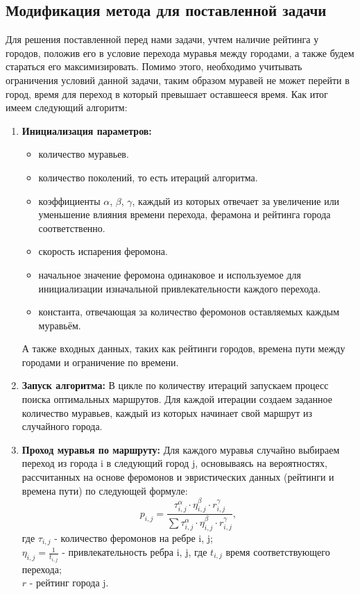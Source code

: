 \subsection{Модификация метода для поставленной задачи}
Для решения поставленной перед нами задачи, учтем наличие рейтинга у городов, положив его в условие перехода муравья между городами, а также будем стараться его максимизировать. Помимо этого, необходимо учитывать ограничения условий данной задачи, таким образом муравей не может перейти в город, время для переход в который превышает оставшееся время. Как итог имеем следующий алгоритм:
\begin{enumerate}
    \item \textbf{Инициализация параметров:} 
    \begin{itemize}
        \item количество муравьев.
        \item количество поколений, то есть итераций алгоритма.
        \item коэффициенты \(\alpha\), \(\beta\), \(\gamma\), каждый из которых отвечает за увеличение или уменьшение влияния времени перехода, ферамона и рейтинга города соответственно. 
        \item скорость испарения феромона.
        \item начальное значение феромона одинаковое и используемое для инициализации изначальной привлекательности каждого перехода. 
        \item константа, отвечающая за количество феромонов оставляемых каждым муравьём.
    \end{itemize}
А также входных данных, таких как рейтинги городов, времена пути между городами и ограничение по времени.
\item \textbf{Запуск алгоритма:} В цикле по количеству итераций запускаем процесс поиска оптимальных маршрутов. Для каждой итерации создаем заданное количество муравьев, каждый из которых начинает свой маршрут из случайного города.
\item \textbf{Проход муравья по маршруту:} Для каждого муравья случайно выбираем переход из города i в следующий город j, основываясь на вероятностях, рассчитанных на основе феромонов и эвристических данных (рейтинги и времена пути) по следующей формуле:
\[p_{i, j}=\frac{\tau_{i, j}^\alpha \cdot \eta_{i, j}^\beta \cdot r_{i, j}^\gamma}{\sum\tau_{i, j}^\alpha \cdot \eta_{i, j}^\beta \cdot r_{i, j}^\gamma},\]
где \(\tau_{i, j}\) - количество феромонов на ребре i, j;\\
\(\eta_{i, j}=\frac{1}{t_{i,j}}\) - привлекательность ребра i, j, где \(t_{i,j}\) время соответствующего перехода;\\
\(r\) - рейтинг города j.


\end{enumerate}
